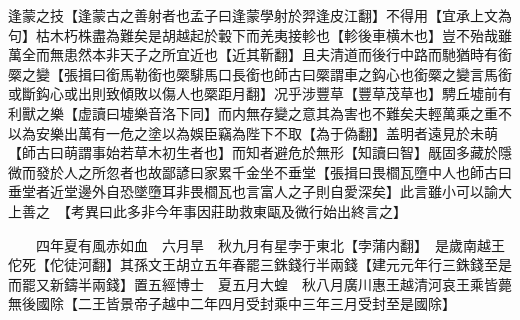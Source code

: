 逢蒙之技【逢蒙古之善射者也孟子曰逢蒙學射於羿逢皮江翻】不得用【宜承上文為句】枯木朽株盡為難矣是胡越起於轂下而羌夷接軫也【軫後車横木也】豈不殆哉雖萬全而無患然本非天子之所宜近也【近其靳翻】且夫清道而後行中路而馳猶時有銜橜之變【張揖曰銜馬勒銜也橜騑馬口長銜也師古曰橜謂車之鈎心也銜橜之變言馬銜或斷鈎心或出則致傾敗以傷人也橜距月翻】况乎涉豐草【豐草茂草也】騁丘墟前有利獸之樂【虚讀曰墟樂音洛下同】而内無存變之意其為害也不難矣夫輕萬乘之重不以為安樂出萬有一危之塗以為娛臣竊為陛下不取【為于偽翻】盖明者遠見於未萌【師古曰萌謂事始若草木初生者也】而知者避危於無形【知讀曰智】旤固多藏於隱微而發於人之所忽者也故鄙諺曰家累千金坐不垂堂【張揖曰畏櫩瓦墮中人也師古曰垂堂者近堂邊外自恐墜墮耳非畏櫩瓦也言富人之子則自愛深矣】此言雖小可以諭大上善之　【考異曰此多非今年事因莊助救東甌及微行始出終言之】

　　四年夏有風赤如血　六月旱　秋九月有星孛于東北【孛蒲内翻】　是歲南越王佗死【佗徒河翻】其孫文王胡立五年春罷三銖錢行半兩錢【建元元年行三銖錢至是而罷又新鑄半兩錢】置五經博士　夏五月大蝗　秋八月廣川惠王越清河哀王乘皆薨無後國除【二王皆景帝子越中二年四月受封乘中三年三月受封至是國除】

